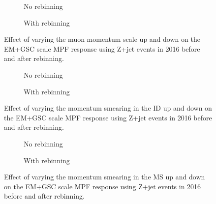 \begin{figure}[!ht]
\centering
\begin{subfigure}{.5\textwidth}
\centering
{}
\caption{No rebinning}
\end{subfigure}%
\begin{subfigure}{.5\textwidth}  \centering
{}
\caption{With rebinning}
\end{subfigure}
\caption{Effect of varying the muon momentum scale up and down on the EM+GSC scale MPF response using Z+jet events in 2016 before and after rebinning. }
\label{Fig:MuonsScaleZJetEM2016}
\end{figure}

\begin{figure}[!ht]
\centering
\begin{subfigure}{.5\textwidth}
\centering
{}
\caption{No rebinning}
\end{subfigure}%
\begin{subfigure}{.5\textwidth}  \centering
{}
\caption{With rebinning}
\end{subfigure}
\caption{Effect of varying the momentum smearing in the ID up and down on the EM+GSC scale MPF response using Z+jet events in 2016 before and after rebinning. }
\label{Fig:MuonsIDZJetEM2016}
\end{figure}

\begin{figure}[!ht]
\centering
\begin{subfigure}{.5\textwidth}
\centering
{}
\caption{No rebinning}
\end{subfigure}%
\begin{subfigure}{.5\textwidth}  \centering
{}
\caption{With rebinning}
\end{subfigure}
\caption{Effect of varying the momentum smearing in the MS up and down on the EM+GSC scale MPF response using Z+jet events in 2016 before and after rebinning. }
\label{Fig:MuonsMSZJetEM2016}
\end{figure}


